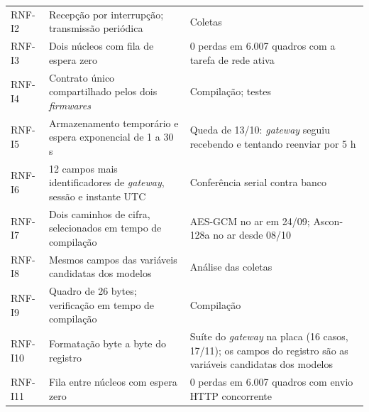\begin{quadro}[!htbp]
\begin{tabular}{lp{}p{8cm}}
RNF-I2 & Recepção por interrupção; transmissão periódica & Coletas \\
RNF-I3 & Dois núcleos com fila de espera zero & 0 perdas em 6.007 quadros com a tarefa de rede ativa \\
RNF-I4 & Contrato único compartilhado pelos dois \textit{firmwares} & Compilação; testes \\
RNF-I5 & Armazenamento temporário e espera exponencial de 1 a 30 s & Queda de 13/10: \textit{gateway} seguiu recebendo e tentando reenviar por 5 h \\
RNF-I6 & 12 campos mais identificadores de \textit{gateway}, sessão e instante UTC & Conferência serial contra banco \\
RNF-I7 & Dois caminhos de cifra, selecionados em tempo de compilação & AES-GCM no ar em 24/09; Ascon-128a no ar desde 08/10 \\
RNF-I8 & Mesmos campos das variáveis candidatas dos modelos & Análise das coletas \\
RNF-I9 & Quadro de 26 bytes; verificação em tempo de compilação & Compilação \\
RNF-I10 & Formatação byte a byte do registro & Suíte do \textit{gateway} na placa (16 casos, 17/11); os campos do registro são as variáveis candidatas dos modelos \\
RNF-I11 & Fila entre núcleos com espera zero & 0 perdas em 6.007 quadros com envio HTTP concorrente \\
\hline
\end{tabular}
\end{quadro}


